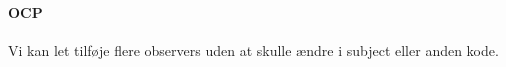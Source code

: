 \paragraph{OCP} 
Vi kan let tilføje flere observers uden at skulle ændre i subject eller anden kode.

